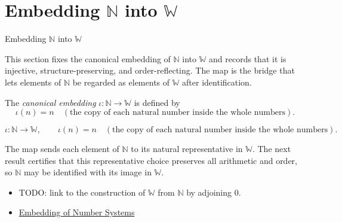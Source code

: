 \section{Embedding $\mathbb{N}$ into $\mathbb{W}$}
\label{sec:embedding-n-into-w}

\begin{topicbox}{Embedding $\mathbb{N}$ into $\mathbb{W}$}
\begin{exposition}
This section fixes the canonical embedding of $\mathbb{N}$ into $\mathbb{W}$ and records that it is injective, structure-preserving, and order-reflecting. The map is the bridge that lets elements of $\mathbb{N}$ be regarded as elements of $\mathbb{W}$ after identification.
\end{exposition}
\end{topicbox}
\begin{tcolorbox}[colback=defbox, colframe=defborder, arc=2pt,
  left=6pt, right=6pt, top=4pt, bottom=4pt,
  title={\small\textbf{Definition (Embedding $\mathbb{N}$ into $\mathbb{W}$)}},
  fonttitle=\small\bfseries]
\begin{definition}
\label{def:embedding-n-into-w}
The \emph{canonical embedding} $\iota:\mathbb{N}\to \mathbb{W}$ is defined by
\[
\iota(n)=n \quad(\text{the copy of each natural number inside the whole numbers}).
\]
\end{definition}
\end{tcolorbox}
\begin{remark*}
\[
\iota:\mathbb{N}\to \mathbb{W},\qquad \iota(n)=n \quad(\text{the copy of each natural number inside the whole numbers}).
\]
\end{remark*}
\begin{remark*}[Interpretation]
The map sends each element of $\mathbb{N}$ to its natural representative in $\mathbb{W}$. The next result certifies that this representative choice preserves all arithmetic and order, so $\mathbb{N}$ may be identified with its image in $\mathbb{W}$.
\end{remark*}
\begin{dependencies}
\begin{itemize}
  \item TODO: link to the construction of $\mathbb{W}$ from $\mathbb{N}$ by adjoining $0$.
  \item \hyperref[def:number-system-embedding]{Embedding of Number Systems}
\end{itemize}
\end{dependencies}
